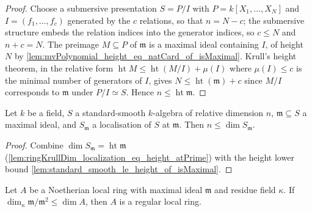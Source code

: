 \begin{proof}
  Choose a submersive presentation \(S = P/I\) with
  \(P = k[X_1, \dots, X_N]\) and \(I = (f_1, \dots, f_c)\) generated by the
  \(c\) relations, so that \(n = N - c\); the submersive structure embeds the
  relation indices into the generator indices, so \(c \le N\) and
  \(n + c = N\). The preimage \(M \subseteq P\) of \(\mathfrak m\) is a maximal
  ideal containing \(I\), of height \(N\) by
  \cref{lem:mvPolynomial_height_eq_natCard_of_isMaximal}. Krull's height
  theorem, in the relative form
  \(\operatorname{ht} M \le \operatorname{ht}(M/I) + \mu(I)\) where
  \(\mu(I) \le c\) is the minimal number of generators of \(I\), gives
  \(N \le \operatorname{ht}(\mathfrak m) + c\) since \(M/I\) corresponds to
  \(\mathfrak m\) under \(P/I \simeq S\). Hence
  \(n \le \operatorname{ht}\mathfrak m\).
\end{proof}

\begin{lemma}
  \label{lem:standard_smooth_le_ringKrullDim_localization}
  Let \(k\) be a field, \(S\) a standard-smooth \(k\)-algebra of relative
  dimension \(n\), \(\mathfrak m \subseteq S\) a maximal ideal, and
  \(S_{\mathfrak m}\) a localisation of \(S\) at \(\mathfrak m\). Then
  \(n \le \dim S_{\mathfrak m}\).
\end{lemma}

\begin{proof}
  Combine \(\dim S_{\mathfrak m} = \operatorname{ht}\mathfrak m\)
  (\cref{lem:ringKrullDim_localization_eq_height_atPrime}) with the height
  lower bound \cref{lem:standard_smooth_le_height_of_isMaximal}.
\end{proof}

\begin{lemma}
  \label{lem:regular_of_finrank_cotangent_le_dim}
  Let \(A\) be a Noetherian local ring with maximal ideal \(\mathfrak m\) and
  residue field \(\kappa\). If
  \(\dim_\kappa \mathfrak m/\mathfrak m^2 \le \dim A\), then \(A\) is a
  regular local ring.
\end{lemma}

